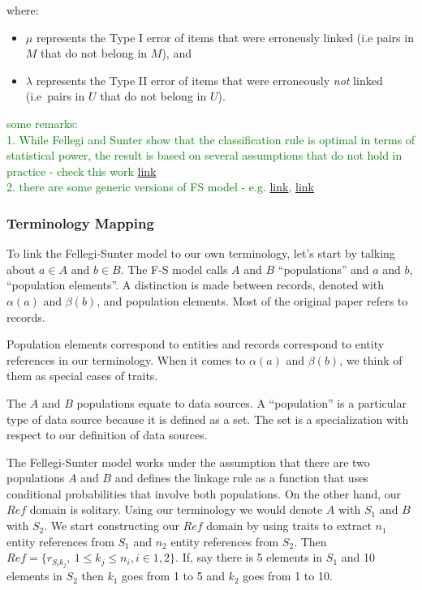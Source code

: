 where:

\begin{itemize}
    \item $\mu$ represents the Type I error of items that were erroneusly
    linked (i.e pairs in $M$ that do not belong in $M$), and
    \item $\lambda$ represents the Type II error of items that were
    erroneously \textit{not} linked (i.e~pairs in $U$ that do not belong in
    $U$).
\end{itemize}


\textcolor{green}{some remarks:\\ 
1. While Fellegi and Sunter show that the classification rule is optimal in terms of statistical power, the result is based on several assumptions that do not hold in practice - check this work \href{https://www.jstor.org/stable/23024863?seq=1}{link}\\
2. there are some generic versions of FS model - e.g. \href{https://www.jstor.org/stable/pdf/24246450.pdf}{link}, \href{https://projecteuclid.org/journals/annals-of-applied-statistics/volume-8/issue-4/Detecting-duplicates-in-a-homicide-registry-using-a-Bayesian-partitioning/10.1214/14-AOAS779.full}{link}\\
}

\subsubsection[fms-term]{Terminology Mapping}\label{subsubsec:fsm-term}

To link the Fellegi-Sunter model to our own terminology, let's start by
talking about $a \in A$ and $b \in B$.
The F-S model calls $A$ and $B$ ``populations'' and $a$ and $b$,
``population elements''.
A distinction is made between records, denoted with $\alpha(a)$ and
$\beta(b)$, and population elements.
Most of the original paper refers to records.

Population elements correspond to entities and records correspond to entity
references in our terminology.
When it comes to $\alpha(a)$ and $\beta(b)$, we think of them as special
cases of traits.
    
The $A$ and $B$ populations equate to data sources.
A ``population'' is a particular type of data source because it is defined
as a set.
The set is a specialization with respect to our definition of data sources.

The Fellegi-Sunter model works under the assumption that there are two
populations $A$ and $B$ and defines the linkage rule as a function that uses
conditional probabilities that involve both populations.
On the other hand, our $Ref$ domain is solitary.
Using our terminology we would denote $A$ with $S_1$ and $B$ with $S_2$.
We start constructing our $Ref$ domain by using traits to extract $n_1$
entity references from $S_1$ and $n_2$ entity references from $S_2$.
Then $Ref = \{r_{{S_i}{k_j}},~1 \leq k_j \leq n_i, i \in {1, 2} \}$.
If, say there is 5 elements in $S_1$ and 10 elements in $S_2$ then $k_1$ goes
from 1 to 5 and $k_2$ goes from 1 to 10.

